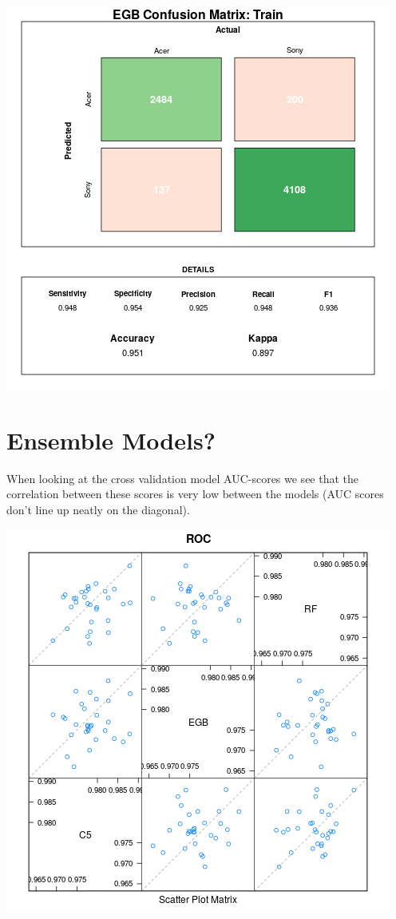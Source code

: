 \documentclass[12pt,a4paper,leqno]{report}
\theoremstyle{plain}
\theoremstyle{definition}
\theoremstyle{remark}
\begin{document}
\bigskip
{
    \centering
    \includegraphics[width=\textwidth,height=\textheight,keepaspectratio]{cm_egb_train.png}
    \par
}
\bigskip

\section{Ensemble Models?}

When looking at the cross validation model AUC-scores we see that the
correlation between these scores is very low between the models
(AUC scores don't line up neatly on the diagonal).

\bigskip
{
    \centering
    \includegraphics[width=\textwidth,height=\textheight,keepaspectratio]{model_prediction_correlations.png}
    \par
}
\bigskip
\end{document}
